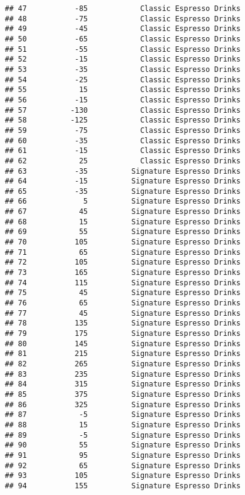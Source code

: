 \documentclass[
]{article}
\begin{document}
\begin{verbatim}
## 47           -85            Classic Espresso Drinks
## 48           -75            Classic Espresso Drinks
## 49           -45            Classic Espresso Drinks
## 50           -65            Classic Espresso Drinks
## 51           -55            Classic Espresso Drinks
## 52           -15            Classic Espresso Drinks
## 53           -35            Classic Espresso Drinks
## 54           -25            Classic Espresso Drinks
## 55            15            Classic Espresso Drinks
## 56           -15            Classic Espresso Drinks
## 57          -130            Classic Espresso Drinks
## 58          -125            Classic Espresso Drinks
## 59           -75            Classic Espresso Drinks
## 60           -35            Classic Espresso Drinks
## 61           -15            Classic Espresso Drinks
## 62            25            Classic Espresso Drinks
## 63           -35          Signature Espresso Drinks
## 64           -15          Signature Espresso Drinks
## 65           -35          Signature Espresso Drinks
## 66             5          Signature Espresso Drinks
## 67            45          Signature Espresso Drinks
## 68            15          Signature Espresso Drinks
## 69            55          Signature Espresso Drinks
## 70           105          Signature Espresso Drinks
## 71            65          Signature Espresso Drinks
## 72           105          Signature Espresso Drinks
## 73           165          Signature Espresso Drinks
## 74           115          Signature Espresso Drinks
## 75            45          Signature Espresso Drinks
## 76            65          Signature Espresso Drinks
## 77            45          Signature Espresso Drinks
## 78           135          Signature Espresso Drinks
## 79           175          Signature Espresso Drinks
## 80           145          Signature Espresso Drinks
## 81           215          Signature Espresso Drinks
## 82           265          Signature Espresso Drinks
## 83           235          Signature Espresso Drinks
## 84           315          Signature Espresso Drinks
## 85           375          Signature Espresso Drinks
## 86           325          Signature Espresso Drinks
## 87            -5          Signature Espresso Drinks
## 88            15          Signature Espresso Drinks
## 89            -5          Signature Espresso Drinks
## 90            55          Signature Espresso Drinks
## 91            95          Signature Espresso Drinks
## 92            65          Signature Espresso Drinks
## 93           105          Signature Espresso Drinks
## 94           155          Signature Espresso Drinks

\end{verbatim}
\end{document}
